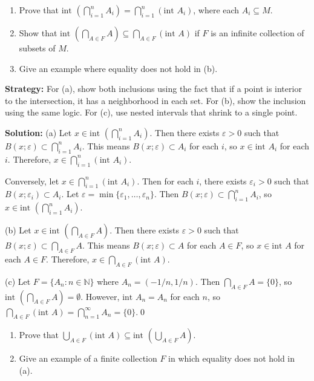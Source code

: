 \begin{problembox}
\begin{enumerate}[label=\alph*)]
\item Prove that \(\text{int } \left(\bigcap_{i=1}^n A_i\right) = \bigcap_{i=1}^n (\text{int } A_i)\), where each \( A_i \subseteq M \).
\item Show that \(\text{int } \left(\bigcap_{A \in F} A\right) \subseteq \bigcap_{A \in F} (\text{int } A)\) if \( F \) is an infinite collection of subsets of \( M \).
\item Give an example where equality does not hold in (b).
\end{enumerate}
\end{problembox}

\noindent\textbf{Strategy:} For (a), show both inclusions using the fact that if a point is interior to the intersection, it has a neighborhood in each set. For (b), show the inclusion using the same logic. For (c), use nested intervals that shrink to a single point.

\bigskip\noindent\textbf{Solution:} 
(a) Let $x \in \text{int }(\bigcap_{i=1}^n A_i)$. Then there exists $\varepsilon > 0$ such that $B(x;\varepsilon) \subset \bigcap_{i=1}^n A_i$. This means $B(x;\varepsilon) \subset A_i$ for each $i$, so $x \in \text{int } A_i$ for each $i$. Therefore, $x \in \bigcap_{i=1}^n (\text{int } A_i)$.

Conversely, let $x \in \bigcap_{i=1}^n (\text{int } A_i)$. Then for each $i$, there exists $\varepsilon_i > 0$ such that $B(x;\varepsilon_i) \subset A_i$. Let $\varepsilon = \min\{\varepsilon_1, \ldots, \varepsilon_n\}$. Then $B(x;\varepsilon) \subset \bigcap_{i=1}^n A_i$, so $x \in \text{int }(\bigcap_{i=1}^n A_i)$.

(b) Let $x \in \text{int }(\bigcap_{A \in F} A)$. Then there exists $\varepsilon > 0$ such that $B(x;\varepsilon) \subset \bigcap_{A \in F} A$. This means $B(x;\varepsilon) \subset A$ for each $A \in F$, so $x \in \text{int } A$ for each $A \in F$. Therefore, $x \in \bigcap_{A \in F} (\text{int } A)$.

(c) Let $F = \{A_n : n \in \mathbb{N}\}$ where $A_n = (-1/n, 1/n)$. Then $\bigcap_{A \in F} A = \{0\}$, so $\text{int }(\bigcap_{A \in F} A) = \emptyset$. However, $\text{int } A_n = A_n$ for each $n$, so $\bigcap_{A \in F} (\text{int } A) = \bigcap_{n=1}^{\infty} A_n = \{0\}$.\qed


\begin{problembox}
\begin{enumerate}[label=\alph*)]
\item Prove that \(\bigcup_{A \in F} (\text{int } A) \subseteq \text{int } \left(\bigcup_{A \in F} A\right)\).
\item Give an example of a finite collection \( F \) in which equality does not hold in (a).
\end{enumerate}
\end{problembox}

